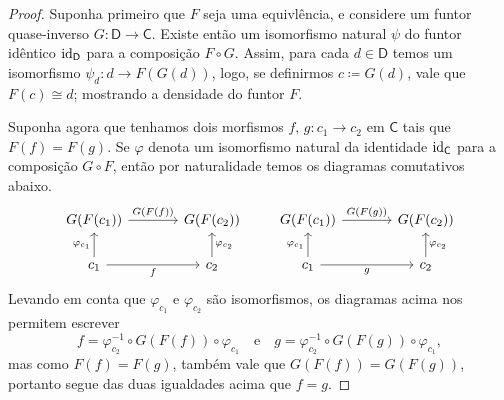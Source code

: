 \begin{proof}
  Suponha primeiro que $F$ seja uma equivlência, e considere um funtor quase-inverso $G: \mathsf{D} \to \mathsf{C}$.
  Existe então um isomorfismo natural $\psi$ do funtor idêntico $\mathrm{id}_{\mathsf{D}}$ para a composição $F \circ G$.
  Assim, para cada $d \in \mathsf{D}$ temos um isomorfismo $\psi_{d}: d \to F(G(d))$, logo, se definirmos $c \coloneqq G(d)$, vale que $F(c) \cong d$; mostrando a densidade do funtor $F$.

  Suponha agora que tenhamos dois morfismos $f,\, g: c_{1} \to c_{2}$ em $\mathsf{C}$ tais que $F(f) = F(g)$.
  Se $\varphi$ denota um isomorfismo natural da identidade $\mathrm{id}_{\mathsf{C}}$ para a composição $G \circ F$, então por naturalidade temos os diagramas comutativos abaixo.
  \begin{displaymath}
    \begin{tikzcd}[column sep=1.25cm]
      G(F(c_{1}))
      \arrow[r, "G(F(f))"]
      & G(F(c_{2}))
      \\ c_{1}
      \arrow[r, "f" swap]
      \arrow[u, "\varphi_{c_{1}}"]
      & c_{2}
      \arrow[u, "\varphi_{c_{2}}" swap]
    \end{tikzcd}
    \qquad
    \begin{tikzcd}[column sep=1.25cm]
      G(F(c_{1}))
      \arrow[r, "G(F(g))"]
      & G(F(c_{2}))
      \\ c_{1}
      \arrow[r, "g" swap]
      \arrow[u, "\varphi_{c_{1}}"]
      & c_{2}
      \arrow[u, "\varphi_{c_{2}}" swap]
    \end{tikzcd}
  \end{displaymath}
  Levando em conta que $\varphi_{c_{1}}$ e $\varphi_{c_{2}}$ são isomorfismos, os diagramas acima nos permitem escrever
  \begin{displaymath}
    f = \varphi_{c_{2}}^{-1} \circ G(F(f)) \circ \varphi_{c_{1}}  \quad \text{e} \quad g = \varphi_{c_{2}}^{-1} \circ G(F(g)) \circ \varphi_{c_{1}},
  \end{displaymath}
  mas como $F(f) = F(g)$, também vale que $G(F(f)) = G(F(g))$, portanto segue das duas igualdades acima que $f = g$.


\end{proof}
